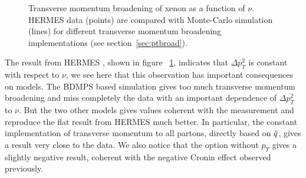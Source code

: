 \begin{figure}[tbp]
  \centering
{}
\caption {Transverse momentum broadening of xenon as a function of $\nu$. 
HERMES data \cite{Airapetian:2009jy} (points) are compared with Monte-Carlo 
simulation (lines) for different transverse momentum broadening implementations 
(see section~\ref{sec:ptbroad}).}
\label{fig:PtC-PtNu}
\end{figure}

The result from HERMES \cite{Airapetian:2009jy}, shown in figure~%
\ref{fig:PtC-PtNu}, indicates that $\Delta p_T^2$ is constant with respect to 
$\nu$, we see here that this observation has important consequences on models. 
The BDMPS based simulation gives too much transverse momentum broadening and 
miss completely the data with an important dependence of $\Delta p_T^2$ to 
$\nu$. But the two other models gives values coherent with the measurement and 
reproduce the flat result from HERMES much better. In particular, the constant 
implementation of transverse momentum to all partons, directly based on 
${\hat q}$, gives a result very close to the data. We also notice that the option 
without $p_T$ gives a slightly negative result, coherent with the negative 
Cronin effect observed previously.

